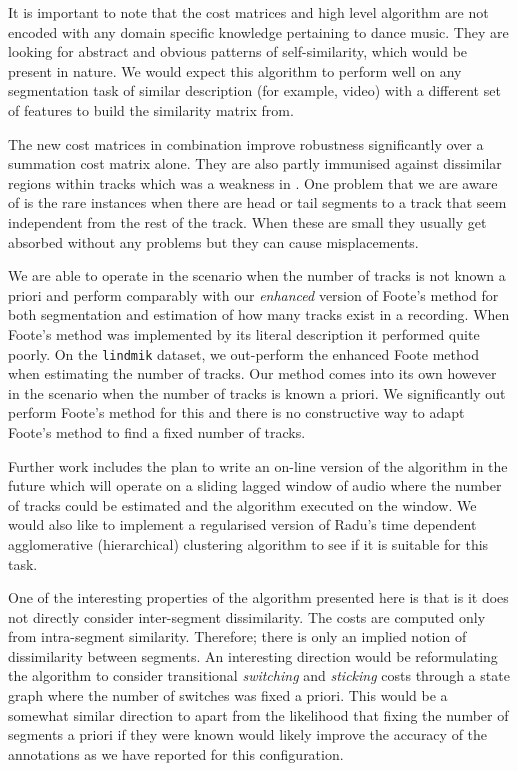 \documentclass[twocolumn]{article}
\begin{document}
It is important to note that the cost matrices and high level algorithm are not encoded with any domain specific knowledge pertaining to dance music. They are looking for abstract and obvious patterns of self-similarity, which would be present in nature. We would expect this algorithm to perform well on any segmentation task of similar description (for example, video) with a different set of features to build the similarity matrix from. 

The new cost matrices in combination improve robustness significantly over a summation cost matrix alone. They are also partly immunised against dissimilar regions within tracks which was a weakness in \citep{scarfe2013long}. One problem that we are aware of is the rare instances when there are head or tail segments to a track that seem independent from the rest of the track. When these are small they usually get absorbed without any problems but they can cause misplacements.

We are able to operate in the scenario when the number of tracks is not known a priori and perform comparably with our \textit{enhanced} version of Foote's \citep{foote2003media} method for both segmentation and estimation of how many tracks exist in a recording. When Foote's method was implemented by its literal description it performed quite poorly. On the \texttt{lindmik} dataset, we out-perform the enhanced Foote method when estimating the number of tracks. Our method comes into its own however in the scenario when the number of tracks is known a priori. We significantly out perform Foote's method for this and there is no constructive way to adapt Foote's method to find a fixed number of tracks. 

Further work includes the plan to write an on-line version of the algorithm in the future which will operate on a sliding lagged window of audio where the number of tracks could be estimated and the algorithm executed on the window. We would also like to implement a regularised version of Radu's time dependent agglomerative (hierarchical) clustering algorithm \citep{radu} to see if it is suitable for this task. 

One of the interesting properties of the algorithm presented here is that is it does not directly consider inter-segment dissimilarity. The costs are computed only from intra-segment similarity. Therefore; there is only an implied notion of dissimilarity between segments. An interesting direction would be reformulating the algorithm to consider transitional \textit{switching} and \textit{sticking} costs through a state graph where the number of switches was fixed a priori. This would be a somewhat similar direction to \citep{goodwin2003audio,goodwin2004dynamic} apart from the likelihood that fixing the number of segments a priori if they were known would likely improve the accuracy of the annotations as we have reported for this configuration.
\end{document}
